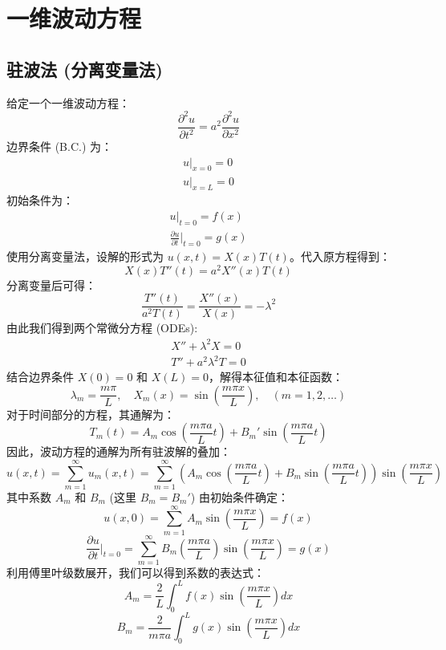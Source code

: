 \documentclass{article}
\begin{document}
	\section{一维波动方程}
	
	\subsection{驻波法 (分离变量法)}
	给定一个一维波动方程：
	$$
	\frac{\partial^2 u}{\partial t^2} = a^2 \frac{\partial^2 u}{\partial x^2}
	$$
	边界条件 (B.C.) 为：
	\begin{gather*}
		u|_{x=0} = 0 \\
		u|_{x=L} = 0
	\end{gather*}
	初始条件为：
	\begin{gather*}
		u|_{t=0} = f(x) \\
		\frac{\partial u}{\partial t}\bigg|_{t=0} = g(x)
	\end{gather*}
	使用分离变量法，设解的形式为 $u(x,t) = X(x)T(t)$。代入原方程得到：
	$$
	X(x)T''(t) = a^2 X''(x)T(t)
	$$
	分离变量后可得：
	$$
	\frac{T''(t)}{a^2 T(t)} = \frac{X''(x)}{X(x)} = -\lambda^2
	$$
	由此我们得到两个常微分方程 (ODEs):
	\begin{gather*}
		X'' + \lambda^2 X = 0 \\
		T'' + a^2 \lambda^2 T = 0
	\end{gather*}
	结合边界条件 $X(0)=0$ 和 $X(L)=0$，解得本征值和本征函数：
	$$
	\lambda_m = \frac{m\pi}{L}, \quad X_m(x) = \sin\left(\frac{m\pi x}{L}\right), \quad (m=1, 2, \dots)
	$$
	对于时间部分的方程，其通解为：
	$$
	T_m(t) = A_m \cos\left(\frac{m\pi a}{L}t\right) + B_m' \sin\left(\frac{m\pi a}{L}t\right)
	$$
	因此，波动方程的通解为所有驻波解的叠加：
	$$
	u(x,t) = \sum_{m=1}^{\infty} u_m(x,t) = \sum_{m=1}^{\infty} \left(A_m \cos\left(\frac{m\pi a}{L}t\right) + B_m \sin\left(\frac{m\pi a}{L}t\right)\right) \sin\left(\frac{m\pi x}{L}\right)
	$$
	其中系数 $A_m$ 和 $B_m$ (这里 $B_m = B_m'$) 由初始条件确定：
	$$
	u(x,0) = \sum_{m=1}^{\infty} A_m \sin\left(\frac{m\pi x}{L}\right) = f(x)
	$$
	$$
	\frac{\partial u}{\partial t}\bigg|_{t=0} = \sum_{m=1}^{\infty} B_m \left(\frac{m\pi a}{L}\right) \sin\left(\frac{m\pi x}{L}\right) = g(x)
	$$
	利用傅里叶级数展开，我们可以得到系数的表达式：
	$$
	A_m = \frac{2}{L} \int_0^L f(x) \sin\left(\frac{m\pi x}{L}\right) dx
	$$
	$$
	B_m = \frac{2}{m\pi a} \int_0^L g(x) \sin\left(\frac{m\pi x}{L}\right) dx
	$$
	
\end{document}
